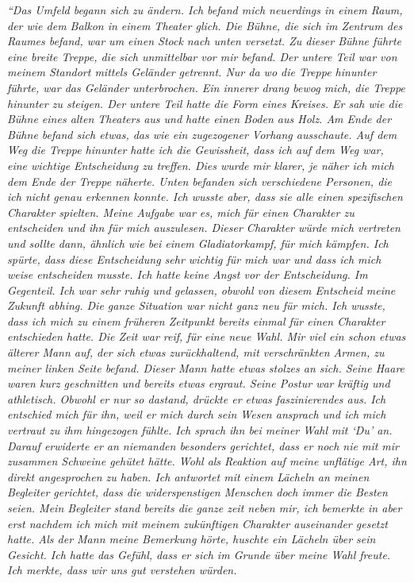 \textit{\textquotedblleft Das Umfeld begann sich zu ändern. Ich befand mich neuerdings in einem Raum, der wie dem Balkon in einem Theater glich. Die Bühne, die sich im Zentrum des Raumes befand, war um einen Stock nach unten versetzt. Zu dieser Bühne führte eine breite Treppe, die sich unmittelbar vor mir befand. Der untere Teil war von meinem Standort mittels Geländer getrennt. Nur da wo die Treppe hinunter führte, war das Geländer unterbrochen. Ein innerer drang bewog mich, die Treppe hinunter zu steigen. Der untere Teil hatte die Form eines Kreises. Er sah wie die Bühne eines alten Theaters aus und hatte einen Boden aus Holz. Am Ende der Bühne befand sich etwas, das wie ein zugezogener Vorhang ausschaute. Auf dem Weg die Treppe hinunter hatte ich die Gewissheit, dass ich auf dem Weg war, eine wichtige Entscheidung zu treffen. Dies wurde mir klarer, je näher ich mich dem Ende der Treppe näherte. \newline 
Unten befanden sich verschiedene Personen, die ich nicht genau erkennen konnte. Ich wusste aber, dass sie alle einen spezifischen Charakter spielten. Meine Aufgabe war es, mich für einen Charakter zu entscheiden und ihn für mich auszulesen. Dieser Charakter würde mich vertreten und sollte dann, ähnlich wie bei einem Gladiatorkampf, für mich kämpfen. Ich spürte, dass diese Entscheidung sehr wichtig für mich war und dass ich mich weise entscheiden musste. Ich hatte keine Angst vor der Entscheidung. Im Gegenteil. Ich war sehr ruhig und gelassen, obwohl von diesem Entscheid meine Zukunft abhing. Die ganze Situation war nicht ganz neu für mich. Ich wusste, dass ich mich zu einem früheren Zeitpunkt bereits einmal für einen Charakter entschieden hatte. \newline 
Die Zeit war reif, für eine neue Wahl. Mir viel ein schon etwas älterer Mann auf, der sich etwas zurückhaltend, mit verschränkten Armen, zu meiner linken Seite befand. Dieser Mann hatte etwas stolzes an sich. Seine Haare waren kurz geschnitten und bereits etwas ergraut. Seine Postur war kräftig und athletisch. Obwohl er nur so dastand, drückte er etwas faszinierendes aus. Ich entschied mich für ihn, weil er mich durch sein Wesen ansprach und ich mich vertraut zu ihm hingezogen fühlte. Ich sprach ihn bei meiner Wahl mit ‘Du’ an. Darauf  erwiderte er an niemanden besonders gerichtet, dass er noch nie mit mir zusammen Schweine gehütet hätte. Wohl als Reaktion auf meine unflätige Art, ihn direkt angesprochen zu haben. Ich antwortet mit einem Lächeln an meinen Begleiter gerichtet, dass die widerspenstigen Menschen doch immer die Besten seien. Mein Begleiter stand bereits die ganze zeit neben mir, ich bemerkte in aber erst nachdem ich mich mit meinem zukünftigen Charakter auseinander gesetzt hatte. Als der Mann meine Bemerkung hörte, huschte ein Lächeln über sein Gesicht. Ich hatte das Gefühl, dass er sich im Grunde über meine Wahl freute. Ich merkte, dass wir uns gut verstehen würden. \newline 
}
